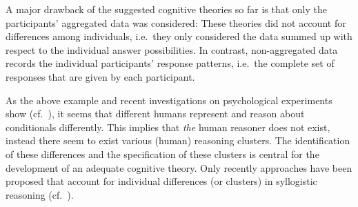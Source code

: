 \documentclass[12pt]{article}
\begin{document}
A major drawback of the suggested cognitive theories so far is that only the participants'
aggregated data was considered: These theories did not account for differences
among individuals, i.e.\ they only considered the data summed up with respect to the individual answer possibilities. In contrast, non-aggregated data records the individual participants' response patterns, i.e.\ the complete set of responses that are given by each participant.


As the above example and recent investigations on psychological experiments show (cf.~\cite{khemlani:2016, ragni:2017}), it seems that different humans represent and reason about conditionals differently.
This implies that \textit{the} human reasoner does not exist, instead there 
seem to exist various (human) reasoning clusters. The identification of these differences and the specification of these clusters is central 
for the development of an adequate cognitive theory. Only recently approaches have been proposed that account for individual differences (or clusters) in syllogistic reasoning (cf.~\cite{khemlani:2016,declare:2017}). 


\end{document}
